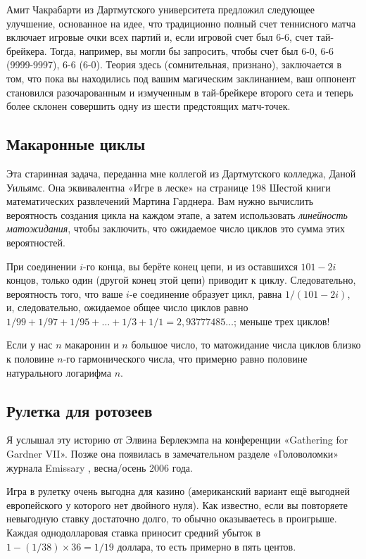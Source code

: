 Амит Чакрабарти из Дартмутского университета предложил следующее улучшение, основанное на идее, что традиционно полный счет теннисного матча включает игровые очки всех партий и, если игровой счет был 6-6, счет тай-брейкера. Тогда, например, вы могли бы запросить, чтобы счет был 6-0, 6-6 (9999-9997), 6-6 (6-0). Теория здесь (сомнительная, признано), заключается в том, что пока вы находились под вашим магическим заклинанием, ваш оппонент становился разочарованным и измученным в тай-брейкере второго сета и теперь более склонен совершить одну из шести предстоящих матч-точек.

\subsection*{Макаронные циклы}

Эта старинная задача, переданна мне коллегой из Дартмутского колледжа, Даной Уильямс.
Она эквивалентна «Игре в леске» на странице 198 Шестой книги математических развлечений Мартина Гарднера.
Вам нужно вычислить вероятность создания цикла на каждом этапе, а затем использовать \emph{линейность матожидания}, чтобы заключить, что ожидаемое число циклов это сумма этих вероятностей.

При соединении $i$-го конца, вы берёте конец цепи, и из оставшихся $101 - 2i$ концов, только один (другой конец этой цепи) приводит к циклу.
Следовательно, вероятность того, что ваше $i$-е соединение образует цикл, равна $1/(101 - 2i)$, и, следовательно, ожидаемое общее число циклов равно $1/99 + 1/97 + 1/95 +\dots + 1/3 + 1/1 = 2{,}93777485\dots$; меньше трех циклов!

Если у нас $n$ макаронин и $n$ большое число, то матожидание числа циклов близко к половине $n$-го гармонического числа, что примерно равно половине натурального логарифма $n$.

\subsection*{Рулетка для ротозеев}

Я услышал эту историю от Элвина Берлекэмпа на конференции
«Gathering for Gardner VII».
Позже она появилась в замечательном разделе «Головоломки» журнала Emissary \cite{berlekamp-buhle}, весна/осень 2006 года.

Игра в рулетку очень выгодна для казино (американский вариант ещё выгодней европейского у которого нет двойного нуля).
Как известно, если вы повторяете невыгодную ставку достаточно долго, то обычно оказываетесь в проигрыше.
Каждая однодолларовая ставка приносит средний убыток в  $1 - (1/38) \times 36 = 1/19$ доллара, то есть примерно в пять центов.

